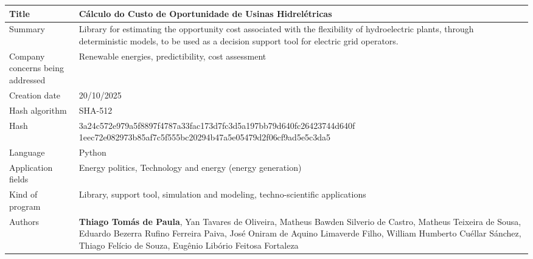 \begin{tabular}{L{3cm} L{12cm}}
\toprule
    Title & Cálculo do Custo de Oportunidade de Usinas Hidrelétricas \\
\midrule
    Summary & 
    Library for estimating the opportunity cost associated with the flexibility of hydroelectric plants, 
    through deterministic models, 
    to be used as a decision support tool for electric grid operators. \\
\midrule
    Company concerns being addressed &
    Renewable energies, predictibility, cost assessment \\
\midrule
    Creation date & 20/10/2025 \\
\midrule
    Hash algorithm & SHA-512 \\
\midrule
    Hash & 
    3a24c572e979a5f8897f4787a33fac173d7fc3d5a197bb79d640fc26423744d640f
    1eec72e082973b85af7c5f555bc20294b47a5e05479d2f06cf9ad5e5c3da5 \\
\midrule
    Language & Python \\
\midrule
    Application fields & Energy politics, Technology and energy (energy generation) \\
\midrule
    Kind of program & Library, support tool, simulation and modeling, techno-scientific applications \\
\midrule
    Authors & 
        \textbf{Thiago Tomás de Paula}, 
        Yan Tavares de Oliveira, 
        Matheus Bawden Silverio de Castro, 
        Matheus Teixeira de Sousa, 
        Eduardo Bezerra Rufino Ferreira Paiva, 
        José Oniram de Aquino Limaverde Filho, 
        William Humberto Cuéllar Sánchez, 
        Thiago Felício de Souza, 
        Eugênio Libório Feitosa Fortaleza \\
\bottomrule
\end{tabular}